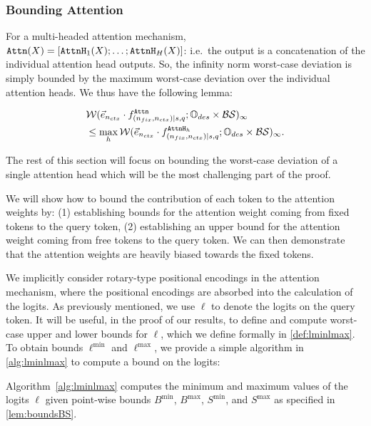 \subsubsection{Bounding Attention}
\label{subsec:attention_bounds}
For a multi-headed attention mechanism, $\texttt{Attn}(X) = [\texttt{AttnH}_1(X); \ldots; \texttt{AttnH}_H(X)]$: i.e.\ the output is a concatenation of the individual attention head outputs.
So, the infinity norm worst-case deviation is simply bounded by the maximum worst-case deviation over the individual attention heads.
We thus have the following lemma:
\begin{lemma}
	\label{lem:att_bound_by_heads}
	\begin{align*}
		&\mathcal{W}(\vec{e}_{n_{ctx}} \cdot f^{\texttt{Attn}}_{(n_{fix}, {n_{ctx}}) \mid {s}, q} ; \mathbb{O}_{des} \times \mathcal{B} \mathcal{S})_\infty 
	     \\ &\leq 
	     \max_h \mathcal{W}(\vec{e}_{n_{ctx}} \cdot f^{\texttt{AttnH}_h}_{(n_{fix}, {n_{ctx}}) \mid {s}, q} ; \mathbb{O}_{des} \times \mathcal{B} \mathcal{S})_\infty.
	\end{align*}
\end{lemma}
The rest of this section will focus on bounding the worst-case deviation of a single attention head which will be the most challenging part of the proof.

We will show how to bound the contribution of each token to the attention weights by:
(1) establishing bounds for the attention weight coming from fixed tokens to the query token, (2) establishing an upper bound for the attention weight coming from free tokens to the query token.
We can then demonstrate that the attention weights are heavily biased towards the fixed tokens.

We implicitly consider rotary-type positional encodings in the attention mechanism, where the positional encodings are absorbed into the calculation of the logits.
As previously mentioned, we use $\ell$ to denote the logits on the query token.  It will be useful, in the proof of our results, to define and compute worst-case upper and lower bounds for $\ell$, which we define formally in \cref{def:lminlmax}.
To obtain bounds $\ell^{\min}$ and $\ell^{\max}$, we provide a simple algorithm in \cref{alg:lminlmax} to compute a bound on the logits:
\begin{lemma}
	\label{lem:lminlmax}
	Algorithm~\ref{alg:lminlmax} computes the minimum and maximum values of the logits $\ell$ given point-wise bounds $B^{\min}$, $B^{\max}$, $S^{\min}$, and $S^{\max}$ as specified in \cref{lem:boundsBS}.
\end{lemma}


